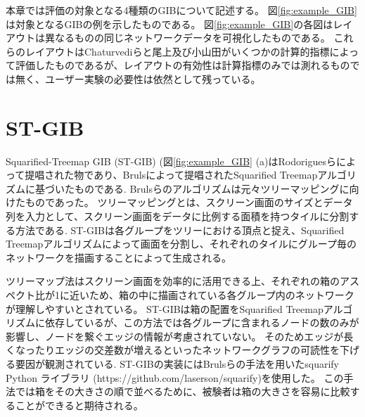 \documentclass{kuee}
\begin{document}
本章では評価の対象となる4種類のGIBについて記述する。
図\ref{fig:example_GIB}は対象となるGIBの例を示したものである。
図\ref{fig:example_GIB}の各図はレイアウトは異なるものの同じネットワークデータを可視化したものである。
これらのレイアウトはChaturvediら\cite{chaturvedi2014group}と尾上及び小山田\cite{onoue2017optimal}がいくつかの計算的指標によって評価したものであるが、レイアウトの有効性は計算指標のみでは測れるものでは無く、ユーザー実験の必要性は依然として残っている。

\section{ST-GIB}
Squarified-Treemap GIB (ST-GIB) (図\ref{fig:example_GIB} (a)はRodoriguesらによって提唱された物であり、Brulsによって提唱されたSquarified Treemapアルゴリズムに基づいたものである\cite{bruls2000squarified}.
Brulsらのアルゴリズムは元々ツリーマッピングに向けたものであった。
ツリーマッピングとは、スクリーン画面のサイズとデータ列を入力として、スクリーン画面をデータに比例する面積を持つタイルに分割する方法である\cite{shneiderman1992tree}.
ST-GIBは各グループをツリーにおける頂点と捉え、Squarified Treemapアルゴリズムによって画面を分割し、それぞれのタイルにグループ毎のネットワークを描画することによって生成される。

ツリーマップ法はスクリーン画面を効率的に活用できる上、それぞれの箱のアスペクト比が1に近いため、箱の中に描画されている各グループ内のネットワークが理解しやすいとされている\cite{bruls2000squarified}。
ST-GIBは箱の配置をSquarified Treemapアルゴリズムに依存しているが、この方法では各グループに含まれるノードの数のみが影響し、ノードを繋ぐエッジの情報が考慮されていない。
そのためエッジが長くなったりエッジの交差数が増えるといったネットワークグラフの可読性を下げる要因が観測されている\cite{468391,purchase1997aesthetic,purchase1998performance,purchase2002empirical}.
ST-GIBの実装にはBrulsらの手法を用いたsquarify Python ライブラリ (https://github.com/laserson/squarify)を使用した。
この手法では箱をその大きさの順で並べるために、被験者は箱の大きさを容易に比較することができると期待される。
\end{document}
